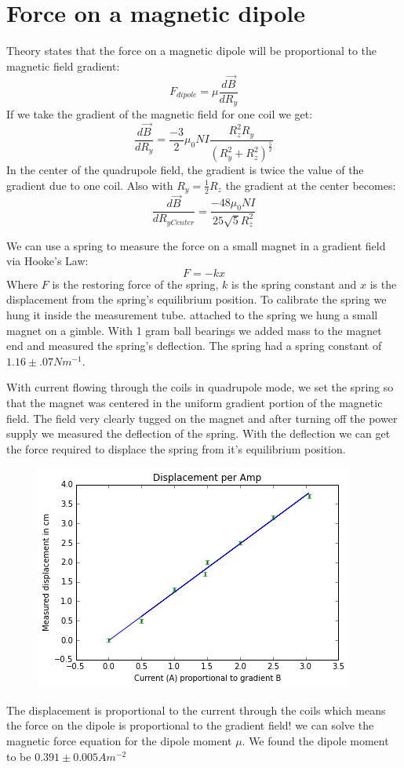 \documentclass[aps,twocolumn,secnumarabic,balancelastpage,amsmath,amssymb,nofootinbib,floatfix]{revtex4-1}
\begin{document}



\section{Force on a magnetic dipole}
Theory states that the force on a magnetic dipole will be proportional to the magnetic field gradient:
$$F_{dipole} = \mu \frac{d\vec B}{d R_y}$$
If we take the gradient of the magnetic field for one coil we get:
$$\frac{d\vec B}{d R_y} = \frac{-3}{2} \mu_0 N I \frac{R_z^2R_y}{(R_y^2 + R_z^2)^{\frac{5}{2}}}$$
In the center of the quadrupole field, the gradient is twice the value of the gradient due to one coil. Also with $R_y = \frac{1}{2} R_z$ the gradient at the center becomes:
$$\frac{d\vec B}{d R_{yCenter}} = \frac{-48 \mu_0 N I}{25 \sqrt{5} R_z^2}$$

We can use a spring to measure the force on a small magnet in a gradient field via Hooke's Law: 
$$F = -kx$$
Where $F$ is the restoring force of the spring, $k$ is the spring constant and $x$ is the displacement from the spring's equilibrium position. 
  To calibrate the spring we hung it inside the measurement tube. attached to the spring we hung a small magnet on a gimble. With 1 gram ball bearings we added mass to the magnet end and measured the spring's deflection. The spring had a spring constant of $1.16 \pm .07 N m^{-1}$.
  
With current flowing through the coils in quadrupole mode, we set the spring so that the magnet was centered in the uniform gradient portion of the magnetic field. The field very clearly tugged on the magnet and after turning off the power supply we measured the deflection of the spring. With the deflection we can get the force required to displace the spring from it's equilibrium position.

\begin{figure}[here]
\includegraphics[width=.47\textwidth]{displacementPerAmp.png}
\label{quadGrad}
\end{figure}
The displacement is proportional to the current through the coils which means the force on the dipole is proportional to the gradient field! we can solve the magnetic force equation for the dipole moment $\mu$. We found the dipole moment to be $0.391 \pm 0.005 A m^{-2}$
\end{document}
